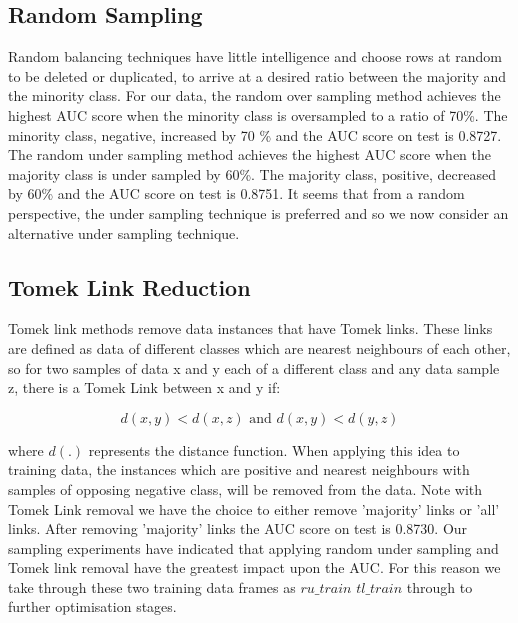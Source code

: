 \documentclass[11pt, oneside]{article}   	%
\begin{document}
\subsection{Random Sampling}
Random balancing techniques have little intelligence and choose rows at random to be deleted or duplicated, to arrive at a desired ratio between the majority and the minority class. For our data, the random over sampling method achieves the highest AUC score when the minority class is oversampled to a ratio of 70\%. The minority class, negative, increased by 70 \% and the AUC score on test is 0.8727. The random under sampling method achieves the highest AUC score when the majority class is under sampled by 60\%. The majority class, positive, decreased by 60\% and the AUC score on test is 0.8751. It seems that from a random perspective, the under sampling technique is preferred and so we now consider an alternative under sampling technique.

\subsection{Tomek Link Reduction}
Tomek link methods remove data instances that have Tomek links. These links are defined as data of different classes which are nearest neighbours of each other, so for two samples of data x and y each of a different class and any data sample z, there is a Tomek Link between x and y if:

\begin{equation}\label{distance}
 d(x,y) < d(x,z) \text{ and } d(x,y) < d(y,z)
 \end{equation}
 
 where $d(.)$ represents the distance function. When applying this idea to training data, the instances which are positive and nearest neighbours with samples of opposing negative class, will be removed from the data. Note with Tomek Link removal we have the choice to either remove 'majority' links or 'all' links. After removing 'majority' links the AUC score on test is 0.8730. Our sampling experiments have indicated that applying random under sampling and Tomek link removal have the greatest impact upon the AUC. For this reason we take through these two training data frames as $ru\_train$  $tl\_train$ through to further optimisation stages.
\end{document}
